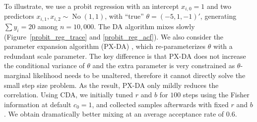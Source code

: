 \documentclass[10pt]{article}
\DeclareMathOperator{\No}{No}
\begin{document}
To illustrate, we use a probit regression with an intercept $x_{i,0}=1$ and two predictors $x_{i,1},x_{i,2}\sim \No(1,1)$, with ``true'' $\theta=(-5,1,-1)'$, generating $\sum y_i=20$ among $n=10,000$. The \cite{albert1993bayesian} DA algorithm mixes slowly (Figure~\ref{probit_reg_trace} and \ref{probit_reg_acf}). 
 We also consider the parameter expansion algorithm (PX-DA) \citep{liu1999parameter,meng1999seeking}, which re-parameterizes $\theta$ with a redundant scale parameter. The key difference is that PX-DA does not increase the conditional variance of $\theta$ and the extra parameter is very constrained as $\theta$-marginal likelihood needs to be unaltered, therefore it cannot directly solve the small step size problem. As the result, PX-DA only mildly reduces the correlation. Using CDA, we initially tuned $r$ and $b$ for $100$ steps using the Fisher information at default $c_0=1$, and collected samples afterwards with fixed $r$ and $b$. We obtain dramatically better mixing at an average acceptance rate of $0.6$.
\end{document}
